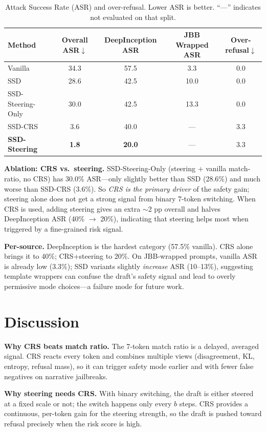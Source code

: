 \documentclass[11pt,a4paper]{article}
\begin{document}
\begin{table}[t]
  \centering
  \caption{Attack Success Rate (ASR) and over-refusal. Lower ASR is better. ``—'' indicates not evaluated on that split.}
  \label{tab:main}
  \begin{tabular}{lcccc}
    \toprule
    Method & Overall ASR$\downarrow$ & DeepInception ASR & JBB Wrapped ASR & Over-refusal$\downarrow$ \\
    \midrule
    Vanilla & 34.3 & 57.5 & 3.3 & 0.0 \\
    SSD & 28.6 & 42.5 & 10.0 & 0.0 \\
    SSD-Steering-Only & 30.0 & 42.5 & 13.3 & 0.0 \\
    SSD-CRS & 3.6 & 40.0 & — & 3.3 \\
    \textbf{SSD-Steering} & \textbf{1.8} & \textbf{20.0} & — & 3.3 \\
    \bottomrule
  \end{tabular}
\end{table}

\textbf{Ablation: CRS vs.\ steering.} SSD-Steering-Only (steering + vanilla match-ratio, no CRS) has 30.0\% ASR—only slightly better than SSD (28.6\%) and much worse than SSD-CRS (3.6\%). So \emph{CRS is the primary driver} of the safety gain; steering alone does not get a strong signal from binary 7-token switching. When CRS is used, adding steering gives an extra $\sim$2 pp overall and halves DeepInception ASR (40\% $\to$ 20\%), indicating that steering helps most when triggered by a fine-grained risk signal.

\textbf{Per-source.} DeepInception is the hardest category (57.5\% vanilla). CRS alone brings it to 40\%; CRS+steering to 20\%. On JBB-wrapped prompts, vanilla ASR is already low (3.3\%); SSD variants slightly \emph{increase} ASR (10--13\%), suggesting template wrappers can confuse the draft's safety signal and lead to overly permissive mode choices—a failure mode for future work.

\section{Discussion}
\label{sec:discussion}

\textbf{Why CRS beats match ratio.} The 7-token match ratio is a delayed, averaged signal. CRS reacts every token and combines multiple views (disagreement, KL, entropy, refusal mass), so it can trigger safety mode earlier and with fewer false negatives on narrative jailbreaks.

\textbf{Why steering needs CRS.} With binary switching, the draft is either steered at a fixed scale or not; the switch happens only every $b$ steps. CRS provides a continuous, per-token gain for the steering strength, so the draft is pushed toward refusal precisely when the risk score is high.
\end{document}
